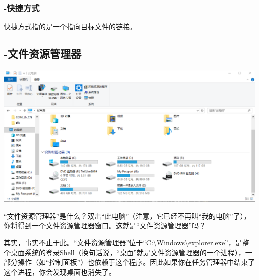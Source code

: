 \subsubsection{-快捷方式}
快捷方式指的是一个指向目标文件的链接。
\subsection{-文件资源管理器}
\begin{center}
	\includegraphics[scale=0.6]{pic/explorer}
\end{center} \par
“文件资源管理器”是什么？双击“此电脑”（注意，它已经不再叫“我的电脑”了），你将得到一个文件资源管理器窗口。这就是“文件资源管理器”吗？\par
其实，事实不止于此。“文件资源管理器”位于“C:\textbackslash Windows\textbackslash explorer.exe”，是整个桌面系统的登录Shell（换句话说，“桌面”就是文件资源管理器的一个进程），一部分操作（如“控制面板”）也依赖于这个程序。因此如果你在任务管理器中结束了这个进程，你会发现桌面也消失了。\par
